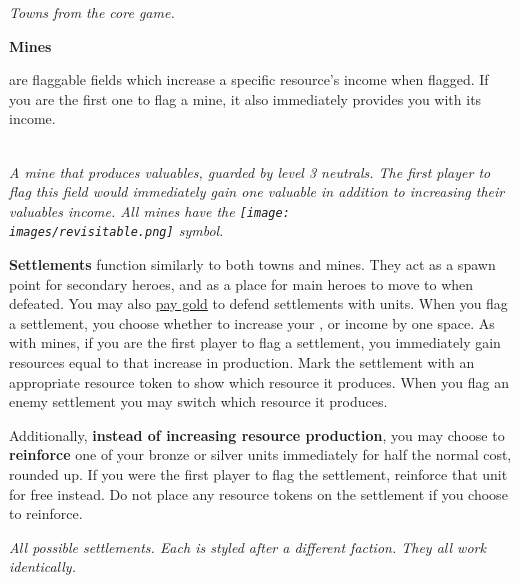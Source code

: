 \begin{multicols*}{2}
\begin{center}
  \textit{Towns from the core game.}
\end{center}

\medskip

\hypertarget{Mines}{\textbf{Mines}} are flaggable fields which increase a specific resource's income when flagged.
If you are the first one to flag a mine, it also immediately provides you with its income.

\begin{center}
  \\
  \textit{A mine that produces valuables, guarded by level 3 neutrals.
    The first player to flag this field would immediately gain one valuable in addition to increasing their valuables income.
    All mines have the \texttt{[image: \\images/revisitable.png]} symbol.
  }
\end{center}

\textbf{Settlements} function similarly to both towns and mines.
They act as a spawn point for secondary heroes, and as a place for main heroes to move to when defeated.
You may also \hyperlink{Town}{pay gold} to defend settlements with units.
When you flag a settlement, you choose whether to increase your ,  or  income by one space.
As with mines, if you are the first player to flag a settlement, you immediately gain resources equal to that increase in production.
Mark the settlement with an appropriate resource token to show which resource it produces.
When you flag an enemy settlement you may switch which resource it produces.\par
Additionally, \textbf{instead of increasing resource production}, you may choose to \textbf{reinforce} one of your bronze or silver units immediately for half the normal cost, rounded up.
If you were the first player to flag the settlement, reinforce that unit for free instead.
Do not place any resource tokens on the settlement if you choose to reinforce.

\bigbreak

\begin{minipage}[h]{\linewidth}
  \centering
  \par
  \textit{All possible settlements.
  Each is styled after a different faction.
  They all work identically.}
\end{minipage}
\end{multicols*}
\bigbreak

